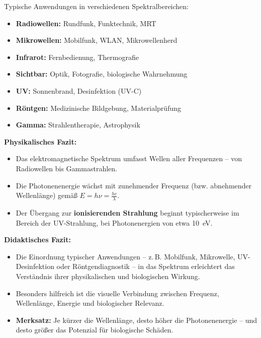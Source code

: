 Typische Anwendungen in verschiedenen Spektralbereichen:

\begin{itemize}
	\item \textbf{Radiowellen:} Rundfunk, Funktechnik, MRT
	\item \textbf{Mikrowellen:} Mobilfunk, WLAN, Mikrowellenherd
	\item \textbf{Infrarot:} Fernbedienung, Thermografie
	\item \textbf{Sichtbar:} Optik, Fotografie, biologische Wahrnehmung
	\item \textbf{UV:} Sonnenbrand, Desinfektion (UV-C)
	\item \textbf{Röntgen:} Medizinische Bildgebung, Materialprüfung
	\item \textbf{Gamma:} Strahlentherapie, Astrophysik
\end{itemize}

\begin{tcolorbox}[hinweisbox,title=Fazit zum elektromagnetischen Spektrum]
	\label{box:Fazit zum elektro}
	\textbf{Physikalisches Fazit:}
	
	\begin{itemize}
		\item Das elektromagnetische Spektrum umfasst Wellen aller Frequenzen – von Radiowellen bis Gammastrahlen.
		\item Die Photonenenergie wächst mit zunehmender Frequenz (bzw. abnehmender Wellenlänge) gemäß \(E = h \nu = \frac{hc}{\lambda}\).
		\item Der Übergang zur \textbf{ionisierenden Strahlung} beginnt typischerweise im Bereich der UV-Strahlung, bei Photonenergien von etwa \SI{10}{\electronvolt}.
	\end{itemize}
	
	\vspace{0.5em}
	\textbf{Didaktisches Fazit:}
	
	\begin{itemize}
		\item Die Einordnung typischer Anwendungen – z.\,B. Mobilfunk, Mikrowelle, UV-Desinfektion oder Röntgendiagnostik – in das Spektrum erleichtert das Verständnis ihrer physikalischen und biologischen Wirkung.
		\item Besonders hilfreich ist die visuelle Verbindung zwischen Frequenz, Wellenlänge, Energie und biologischer Relevanz.
		\item \textbf{Merksatz:} Je kürzer die Wellenlänge, desto höher die Photonenenergie – und desto größer das Potenzial für biologische Schäden.
	\end{itemize}
\end{tcolorbox}
\newpage
\noindent
